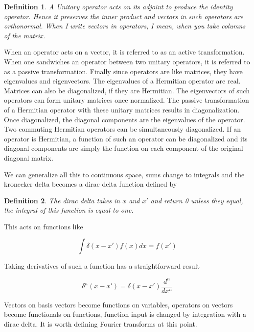 \documentclass{tufte-book}
\newtheorem{definition}{Definition}
\begin{document}
\begin{definition}
	\label{def:11}
	A Unitary operator acts on its adjoint to produce the identity operator. Hence it preserves the inner product and vectors in such operators are orthonormal. When I write vectors in operators, I mean, when you take columns of the matrix.
\end{definition}

When an operator acts on a vector, it is referred to as an active transformation. When one sandwiches an operator between two unitary operators, it is referred to as a passive transformation. Finally since operators are like matrices, they have eigenvalues and eigenvectors. The eigenvalues of a Hermitian operator are real. Matrices can also be diagonalized, if they are Hermitian. The eigenvectors of such operators can form unitary matrices once normalized. The passive transformation of a Hermitian operator with these unitary matrices results in diagonalization. Once diagonalized, the diagonal components are the eigenvalues of the operator. Two commuting Hermitian operators can be simultaneously diagonalized. If an operator is Hermitian, a function of such an operator can be diagonalized and its diagonal components are simply the function on each component of the original diagonal matrix.

We can generalize all this to continuous space, sums change to integrals and the kronecker delta becomes a dirac delta function defined by

\begin{definition}
	\label{def:12}
	The dirac delta takes in $x$ and $x'$ and return 0 unless they equal, the integral of this function is equal to one.
\end{definition}

This acts on functions like

\begin{equation}
	\label{eq:dd}
	\int\delta(x-x')f(x)dx = f(x')
\end{equation}

Taking derivatives of such a function has a straightforward result

\begin{equation}
	\label{eq:9}
	\delta^n(x-x') = \delta(x-x')\frac{d^n}{dx^n}
\end{equation}

Vectors on basis vectors become functions on variables, operators on vectors become functionals on functions, function input is changed by integration with a dirac delta. It is worth defining Fourier transforms at this point.
\end{document}
